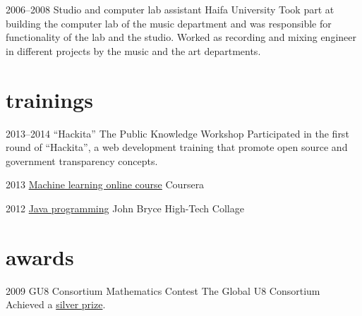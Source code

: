\documentclass[]{friggeri-cv}  %
\begin{document}
\begin{entrylist}

    \entry
    {2006--2008}
    {Studio and computer lab assistant}
    {Haifa University}
    {Took part at building the computer lab of the music department and was responsible for functionality of the lab and the studio. Worked as recording and mixing engineer in different projects by the music and the art departments.}

\end{entrylist}


\section{trainings}

\begin{entrylist}

    \entry
    {2013--2014}
    {“Hackita”}
    {The Public Knowledge Workshop}
    {Participated in the first round of ``Hackita'', a web development training that promote open source and government transparency concepts.}

\end{entrylist}
\begin{entrylist}

    \entry
    {2013}
    {\href{http://db.tt/hcPmtUpn}{Machine learning online course}}
    {Coursera}

\end{entrylist}
\begin{entrylist}

    \entry
    {2012}
    {\href{http://db.tt/g3VdmoOu}{Java programming}}
    {John Bryce High-Tech Collage}
    
\end{entrylist}


\section{awards}

\begin{entrylist}

    \entry
    {2009}
    {GU8 Consortium Mathematics Contest}
    {The Global U8 Consortium}
    {Achieved a \href{http://db.tt/7b5BuXmT}{silver prize}.}

\end{entrylist}
\end{document}
